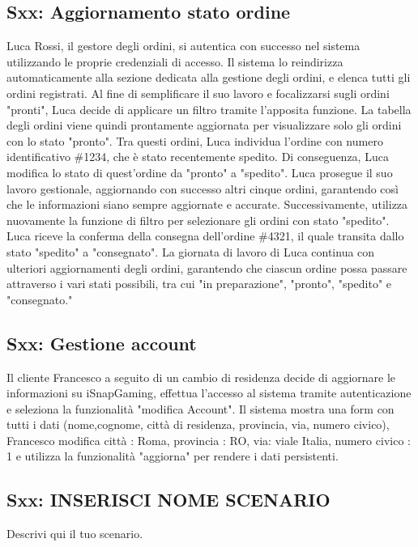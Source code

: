 \documentclass[12pt, a4paper, oneside]{book}
\begin{document}
    \subsection*{Sxx: Aggiornamento stato ordine}
    Luca Rossi, il gestore degli ordini, si autentica con successo nel sistema utilizzando le proprie
    credenziali di accesso. Il sistema lo reindirizza automaticamente alla sezione dedicata alla gestione
    degli ordini, e elenca tutti gli ordini registrati.
    Al fine di semplificare il suo lavoro e focalizzarsi sugli ordini "pronti", Luca decide di applicare
    un filtro tramite l'apposita funzione. La tabella degli ordini viene quindi prontamente aggiornata per
    visualizzare solo gli ordini con lo stato "pronto". Tra questi ordini, Luca individua l'ordine con numero
    identificativo \#1234, che è stato recentemente spedito. Di conseguenza, Luca modifica lo stato di
    quest'ordine da "pronto" a "spedito". Luca prosegue il suo lavoro gestionale, aggiornando con successo
    altri cinque ordini, garantendo così che le informazioni siano sempre aggiornate e accurate.
    Successivamente, utilizza nuovamente la funzione di filtro per selezionare gli ordini con stato "spedito".
    Luca riceve la conferma della consegna dell'ordine \#4321, il quale transita dallo stato "spedito" a
    "consegnato". La giornata di lavoro di Luca continua con ulteriori aggiornamenti degli ordini,
    garantendo che ciascun ordine possa passare attraverso i vari stati possibili, tra cui "in preparazione",
    "pronto", "spedito" e "consegnato."

    \subsection*{Sxx: Gestione account}
    Il cliente Francesco a seguito di un cambio di residenza decide di aggiornare le informazioni su
    iSnapGaming, effettua l'accesso al sistema tramite autenticazione e  seleziona la funzionalità
    "modifica Account". Il sistema mostra una form con tutti i dati (nome,cognome, città di residenza,
    provincia, via, numero civico), Francesco modifica città : Roma, provincia : RO, via: viale Italia,
    numero civico : 1 e utilizza la funzionalità "aggiorna" per rendere i dati persistenti.

    \subsection*{Sxx: INSERISCI NOME SCENARIO}
        Descrivi qui il tuo scenario.
\end{document}
